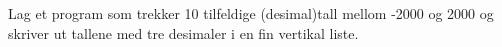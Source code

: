 %
%
Lag et program som trekker 10 tilfeldige (desimal)tall mellom -2000 og 2000 og skriver ut tallene med tre desimaler i en fin vertikal liste.
